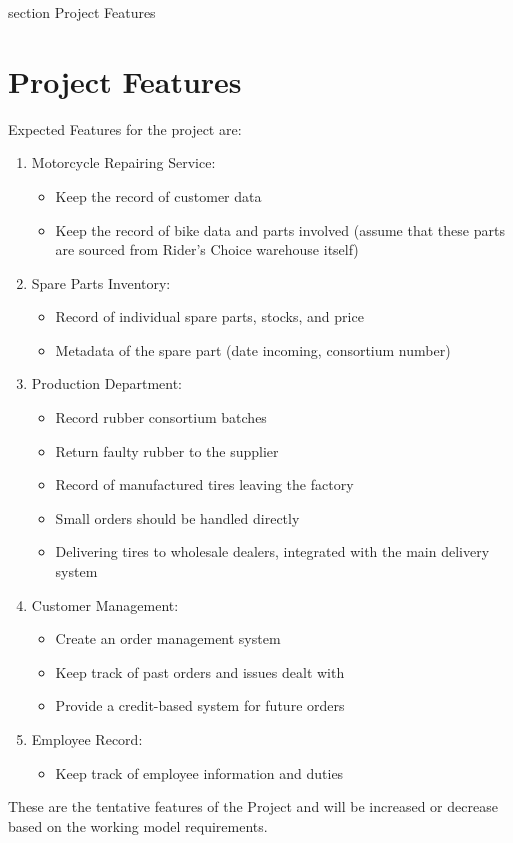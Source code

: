 

 {section} {Project Features}
\section*{Project Features}
\label{Project Features}

Expected Features for the project are:

\begin{enumerate}
   \item Motorcycle Repairing Service:
   \begin{itemize}
     \item Keep the record of customer data
     \item Keep the record of bike data and parts involved (assume that these parts are sourced from Rider's Choice warehouse itself)
   \end{itemize}
   \item Spare Parts Inventory:
   \begin{itemize}
     \item Record of individual spare parts, stocks, and price
     \item Metadata of the spare part (date incoming, consortium number)
   \end{itemize}
   \item Production Department:
   \begin{itemize}
     \item Record rubber consortium batches
     \item Return faulty rubber to the supplier
     \item Record of manufactured tires leaving the factory
     \item Small orders should be handled directly
     \item Delivering tires to wholesale dealers, integrated with the main delivery system
   \end{itemize}
      \item Customer Management:
   \begin{itemize}
     \item Create an order management system
     \item Keep track of past orders and issues dealt with
     \item Provide a credit-based system for future orders
   \end{itemize}
         \item Employee Record:
   \begin{itemize}
     \item Keep track of employee information and duties
   \end{itemize}
\end{enumerate}

These are the tentative features of the Project and will be increased or decrease based on the working model requirements.
\clearpage